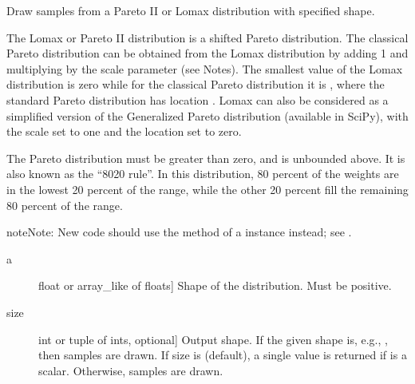 \documentclass[letterpaper,10pt,english]{sphinxmanual}
\begin{document}

\begin{fulllineitems}
\label{\detokenize{infrapy.utils:infrapy.utils.ref2sac.pareto}}
Draw samples from a Pareto II or Lomax distribution with
specified shape.

The Lomax or Pareto II distribution is a shifted Pareto
distribution. The classical Pareto distribution can be
obtained from the Lomax distribution by adding 1 and
multiplying by the scale parameter  (see Notes).  The
smallest value of the Lomax distribution is zero while for the
classical Pareto distribution it is , where the standard
Pareto distribution has location .  Lomax can also
be considered as a simplified version of the Generalized
Pareto distribution (available in SciPy), with the scale set
to one and the location set to zero.

The Pareto distribution must be greater than zero, and is
unbounded above.  It is also known as the “80\sphinxhyphen{}20 rule”.  In
this distribution, 80 percent of the weights are in the lowest
20 percent of the range, while the other 20 percent fill the
remaining 80 percent of the range.

\begin{sphinxadmonition}{note}{Note:}
New code should use the  method of a 
instance instead; see .
\end{sphinxadmonition}
\begin{description}
\item[{a}] \leavevmode{[}float or array\_like of floats{]}
Shape of the distribution. Must be positive.

\item[{size}] \leavevmode{[}int or tuple of ints, optional{]}
Output shape.  If the given shape is, e.g., , then
 samples are drawn.  If size is  (default),
a single value is returned if  is a scalar.  Otherwise,
 samples are drawn.


\end{description}
\end{fulllineitems}
\end{document}
